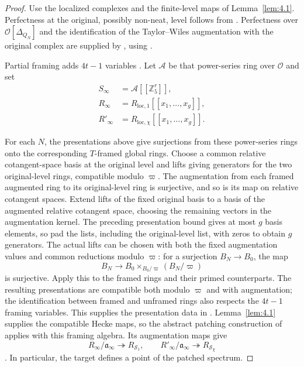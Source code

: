 \documentclass[11pt,a4paper]{article}
\numberwithin{equation}{section}
\begin{document}
\begin{proof}
Use the localized complexes and the finite-level maps of Lemma~\ref{lem:4.1}. Perfectness at the original, possibly non-neat, level follows from \cite[Proposition~5.5.3]{CN}. Perfectness over \(\mathcal O[\Delta_{Q_N}]\) and the identification of the Taylor--Wiles augmentation with the original complex are supplied by \cite[Lemma~5.6.4]{CN}, using \cite[Theorem~5.11]{AKT}.

Partial framing adds \(4t-1\) variables \cite[Lemma~6.2.4]{ACC}. Let \(\mathcal A\) be that power-series ring over \(\mathcal O\) and set
\begin{align*}
S_\infty&=\mathcal A[[\mathbb Z_5^r]],\\
R_\infty&=R_{\mathrm{loc},1}[[x_1,\ldots,x_g]],\\
R'_\infty&=R_{\mathrm{loc},\chi}[[x_1,\ldots,x_g]].
\end{align*}

For each \(N\), the presentations above give surjections from these power-series rings onto the corresponding \(T\)-framed global rings. Choose a common relative cotangent-space basis at the original level and lifts giving generators for the two original-level rings, compatible modulo \(\varpi\). The augmentation from each framed augmented ring to its original-level ring is surjective, and so is its map on relative cotangent spaces. Extend lifts of the fixed original basis to a basis of the augmented relative cotangent space, choosing the remaining vectors in the augmentation kernel. The preceding presentation bound gives at most \(g\) basis elements, so pad the lists, including the original-level list, with zeros to obtain \(g\) generators. The actual lifts can be chosen with both the fixed augmentation values and common reductions modulo \(\varpi\): for a surjection \(B_N\to B_0\), the map
\begin{equation*}
B_N\longrightarrow B_0\times_{B_0/\varpi}(B_N/\varpi)
\end{equation*}
is surjective. Apply this to the framed rings and their primed counterparts. The resulting presentations are compatible both modulo \(\varpi\) and with augmentation; the identification between framed and unframed rings also respects the \(4t-1\) framing variables. This supplies the presentation data in \cite[\S6.4.1, (3)--(4) and its augmentation conditions]{ACC}. Lemma~\ref{lem:4.1} supplies the compatible Hecke maps, so the abstract patching construction of \cite[\S6.4]{ACC} applies with this framing algebra. Its augmentation maps give
\begin{equation*}
R_\infty/\mathfrak a_\infty\twoheadrightarrow R_{\mathcal S_1},
\qquad
R'_\infty/\mathfrak a_\infty\twoheadrightarrow R_{\mathcal S_\chi}
\end{equation*}
\cite[Lemma~6.4.15]{ACC}. In particular, the target defines a point of the patched spectrum.


\end{proof}
\end{document}
